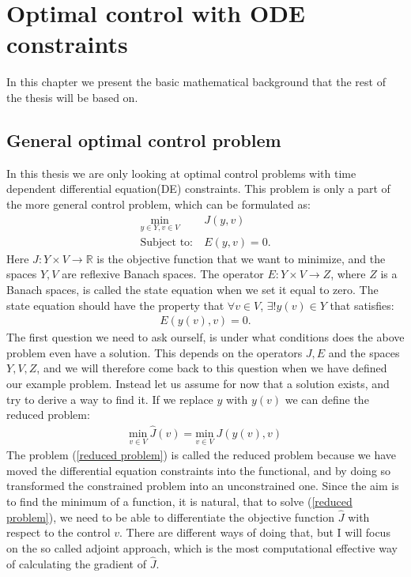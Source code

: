 \chapter{Optimal control with ODE constraints}
In this chapter we present the basic mathematical background that the rest of the thesis will be based on. 
\section{General optimal control problem}
In this thesis we are only looking at optimal control problems with time dependent differential equation(DE) constraints. This problem is only a part of the more general control problem, which can be formulated as:
\begin{align}
\underset{y\in Y,v\in V}{\text{min}} \ &J(y,v) \\
\textrm{Subject to:} \ &E(y,v)=0.
\end{align}
Here $J: Y\times V\rightarrow\mathbb{R}$ is the objective function that we want to minimize, and the spaces $Y,V$ are reflexive Banach spaces. The operator $E:Y\times V \rightarrow Z$, where $Z$ is a Banach spaces, is called the state equation when we set it equal to zero. The state equation should have the property that $\forall v \in V$, $\exists! y(v)\in Y$ that satisfies:
\begin{align*}
E(y(v),v)=0.
\end{align*}
The first question we need to ask ourself, is under what conditions does the above problem even have a solution. This depends on the operators $J,E$ and the spaces $Y,V,Z$, and we will therefore come back to this question when we have defined our example problem. Instead let us assume for now that a solution exists, and try to derive a way to find it. If we replace $y$ with $y(v)$ we can define the reduced problem:
\begin{align}
\underset{v\in V}{\text{min}} \ \hat J(v)=\underset{v\in V}{\text{min}} \ J(y(v),v)  \label{reduced problem}
\end{align}
The problem (\ref{reduced problem}) is called the reduced problem because we have moved the differential equation constraints into the functional, and by doing so transformed the constrained problem into an unconstrained one. Since the aim is to find the minimum of a function, it is natural, that to solve (\ref{reduced problem}), we need to be able to differentiate the objective function $\hat{J}$ with respect to the control $v$. There are different ways of doing that, but I will focus on the so called adjoint approach, which is the most computational effective way of calculating the gradient of $\hat{J}$.
